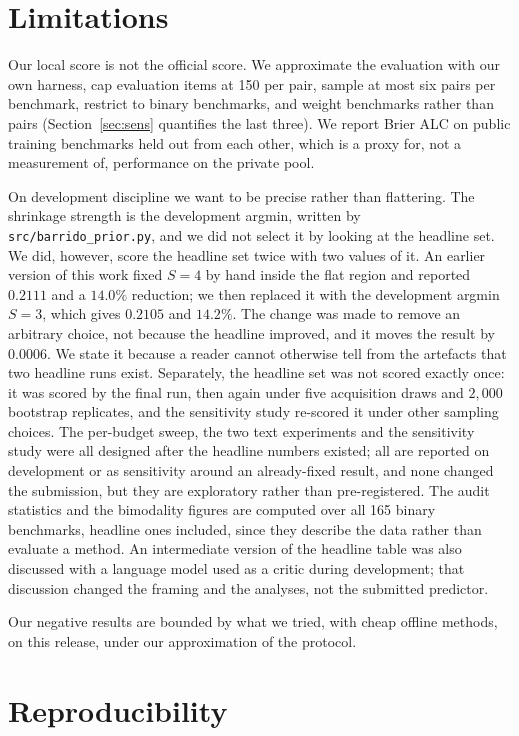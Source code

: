 \documentclass{article}
\begin{document}
\section{Limitations}
\label{sec:limites}

Our local score is not the official score. We approximate the evaluation with our
own harness, cap evaluation items at 150 per pair, sample at most six pairs per
benchmark, restrict to binary benchmarks, and weight benchmarks rather than pairs
(Section~\ref{sec:sens} quantifies the last three). We report Brier ALC on public
training benchmarks held out from each other, which is a proxy for, not a
measurement of, performance on the private pool.

On development discipline we want to be precise rather than flattering. The
shrinkage strength is the development argmin, written by
\texttt{src/barrido\_prior.py}, and we did not select it by looking at the
headline set. We did, however, score the headline set twice with two values of
it. An earlier version of this work fixed $S=4$ by hand inside the flat region and
reported $0.2111$ and a $14.0\%$ reduction; we then replaced it with the
development argmin $S=3$, which gives $0.2105$ and $14.2\%$. The change was made
to remove an arbitrary choice, not because the headline improved, and it moves the
result by $0.0006$. We state it because a reader cannot otherwise tell from the
artefacts that two headline runs exist. Separately, the headline set was not
scored exactly once: it was
scored by the final run, then again under five acquisition draws and
$2{,}000$ bootstrap replicates, and the sensitivity study re-scored it under
other sampling choices. The per-budget sweep, the two text experiments and the
sensitivity study were all designed after the headline numbers existed; all are
reported on development or as sensitivity around an already-fixed result, and
none changed the submission, but they are exploratory rather than
pre-registered. The audit statistics and the bimodality figures are computed over
all 165 binary benchmarks, headline ones included, since they describe the data
rather than evaluate a method. An intermediate version of the headline table was
also discussed with a language model used as a critic during development; that
discussion changed the framing and the analyses, not the submitted predictor.

Our negative results are bounded by what we tried, with cheap offline methods, on
this release, under our approximation of the protocol.

\section{Reproducibility}
\end{document}
